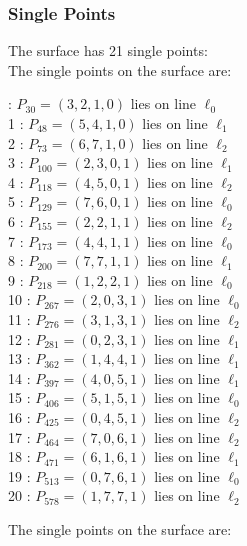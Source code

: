 \documentclass{article}
\begin{document}
{\subsubsection*{Single Points}
The surface has 21 single points:\\
The single points on the surface are:\\
\begin{multicols}{2}
 : $P_{30}=( 3, 2, 1, 0 )$ lies on line $\ell_{0}$\\
1 : $P_{48}=( 5, 4, 1, 0 )$ lies on line $\ell_{1}$\\
2 : $P_{73}=( 6, 7, 1, 0 )$ lies on line $\ell_{2}$\\
3 : $P_{100}=( 2, 3, 0, 1 )$ lies on line $\ell_{1}$\\
4 : $P_{118}=( 4, 5, 0, 1 )$ lies on line $\ell_{2}$\\
5 : $P_{129}=( 7, 6, 0, 1 )$ lies on line $\ell_{0}$\\
6 : $P_{155}=( 2, 2, 1, 1 )$ lies on line $\ell_{2}$\\
7 : $P_{173}=( 4, 4, 1, 1 )$ lies on line $\ell_{0}$\\
8 : $P_{200}=( 7, 7, 1, 1 )$ lies on line $\ell_{1}$\\
9 : $P_{218}=( 1, 2, 2, 1 )$ lies on line $\ell_{0}$\\
10 : $P_{267}=( 2, 0, 3, 1 )$ lies on line $\ell_{0}$\\
11 : $P_{276}=( 3, 1, 3, 1 )$ lies on line $\ell_{2}$\\
12 : $P_{281}=( 0, 2, 3, 1 )$ lies on line $\ell_{1}$\\
13 : $P_{362}=( 1, 4, 4, 1 )$ lies on line $\ell_{1}$\\
14 : $P_{397}=( 4, 0, 5, 1 )$ lies on line $\ell_{1}$\\
15 : $P_{406}=( 5, 1, 5, 1 )$ lies on line $\ell_{0}$\\
16 : $P_{425}=( 0, 4, 5, 1 )$ lies on line $\ell_{2}$\\
17 : $P_{464}=( 7, 0, 6, 1 )$ lies on line $\ell_{2}$\\
18 : $P_{471}=( 6, 1, 6, 1 )$ lies on line $\ell_{1}$\\
19 : $P_{513}=( 0, 7, 6, 1 )$ lies on line $\ell_{0}$\\
20 : $P_{578}=( 1, 7, 7, 1 )$ lies on line $\ell_{2}$\\
\end{multicols}
The single points on the surface are:\\
}
\end{document}
